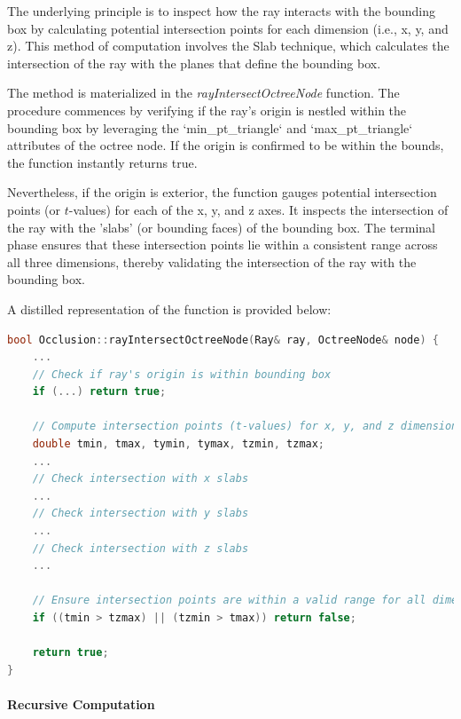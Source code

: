 \documentclass[11pt, a4paper,oneside,chapterprefix=false]{scrbook}
\begin{document}
The underlying principle is to inspect how the ray interacts with the bounding box by calculating potential intersection points for each dimension (i.e., x, y, and z). This method of computation involves the Slab technique, which calculates the intersection of the ray with the planes that define the bounding box.

\vspace{10pt}

The method is materialized in the \emph{rayIntersectOctreeNode} function. The procedure commences by verifying if the ray's origin is nestled within the bounding box by leveraging the `min\_pt\_triangle` and `max\_pt\_triangle` attributes of the octree node. If the origin is confirmed to be within the bounds, the function instantly returns true.

\vspace{10pt}

Nevertheless, if the origin is exterior, the function gauges potential intersection points (or \( t \)-values) for each of the x, y, and z axes. It inspects the intersection of the ray with the 'slabs' (or bounding faces) of the bounding box. The terminal phase ensures that these intersection points lie within a consistent range across all three dimensions, thereby validating the intersection of the ray with the bounding box.

\vspace{10pt}

A distilled representation of the function is provided below:

\begin{lstlisting}[language=C++, caption=Simplified Ray Intersect Bounding Box]
bool Occlusion::rayIntersectOctreeNode(Ray& ray, OctreeNode& node) {
    ...
    // Check if ray's origin is within bounding box
    if (...) return true;
    
    // Compute intersection points (t-values) for x, y, and z dimensions
    double tmin, tmax, tymin, tymax, tzmin, tzmax;
    ...
    // Check intersection with x slabs
    ...
    // Check intersection with y slabs
    ...
    // Check intersection with z slabs
    ...

    // Ensure intersection points are within a valid range for all dimensions
    if ((tmin > tzmax) || (tzmin > tmax)) return false;
    
    return true;
}
\end{lstlisting}

\paragraph{Recursive Computation}
\end{document}
